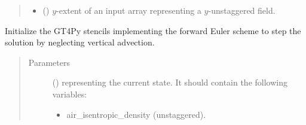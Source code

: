 \documentclass[letterpaper,10pt,english]{sphinxmanual}
\begin{document}
\begin{fulllineitems}
\begin{fulllineitems}
\begin{quote}
\begin{description}
\begin{itemize}
\item {} 
 () \textendash{} \(y\)-extent of an input array representing a \(y\)-unstaggered field.

\end{itemize}

\end{description}\end{quote}

\end{fulllineitems}


\begin{fulllineitems}
\label{\detokenize{api:tasmania.dycore.prognostic_isentropic_forward_euler.PrognosticIsentropicForwardEuler._stencils_stepping_by_neglecting_vertical_advection_initialize}}
Initialize the GT4Py stencils implementing the forward Euler scheme to step the solution
by neglecting vertical advection.
\begin{quote}\begin{description}
\item[{Parameters}] \leavevmode
{} () \textendash{} 
{\hyperref[\detokenize{api:tasmania.storages.state_isentropic.StateIsentropic}]{}} representing the current state.
It should contain the following variables:
\begin{itemize}
\item {} 
air\_isentropic\_density (unstaggered).

\end{itemize}


\end{description}\end{quote}

\end{fulllineitems}



\end{fulllineitems}
\end{document}
